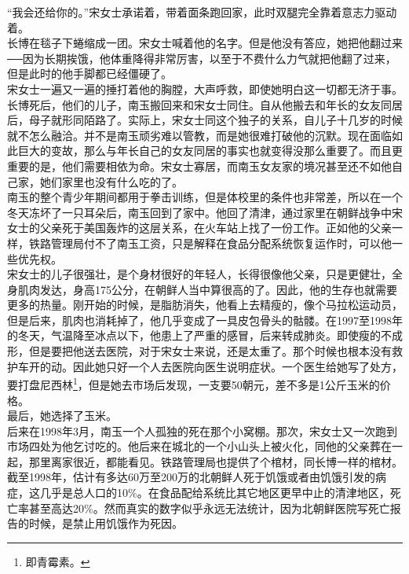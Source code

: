 “我会还给你的。”宋女士承诺着，带着面条跑回家，此时双腿完全靠着意志力驱动着。\\

长博在毯子下蜷缩成一团。宋女士喊着他的名字。但是他没有答应，她把他翻过来──因为长期挨饿，他体重降得非常厉害，以至于不费什么力气就把他翻了过来，但是此时的他手脚都已经僵硬了。\\

宋女士一遍又一遍的捶打着他的胸膛，大声呼救，即使她明白这一切都无济于事。\\

长博死后，他们的儿子，南玉搬回来和宋女士同住。自从他搬去和年长的女友同居后，母子就形同陌路了。实际上，宋女士同这个独子的关系，自儿子十几岁的时候就不怎么融洽。并不是南玉顽劣难以管教，而是她很难打破他的沉默。现在面临如此巨大的变故，那么与年长自己的女友同居的事实也就变得没那么重要了。而且更重要的是，他们需要相依为命。宋女士寡居，而南玉女友家的境况甚至还不如他自己家，她们家里也没有什么吃的了。\\

南玉的整个青少年期间都用于拳击训练，但是体校里的条件也非常差，所以在一个冬天冻坏了一只耳朵后，南玉回到了家中。他回了清津，通过家里在朝鲜战争中宋女士的父亲死于美国轰炸的这层关系，在火车站上找了一份工作。正如他的父亲一样，铁路管理局付不了南玉工资，只是解释在食品分配系统恢复运作时，可以他一些优先权。\\

宋女士的儿子很强壮，是个身材很好的年轻人，长得很像他父亲，只是更健壮，全身肌肉发达，身高175公分，在朝鲜人当中算很高的了。因此，他的生存也就需要更多的热量。刚开始的时候，是脂肪消失，他看上去精瘦的，像个马拉松运动员，但是后来，肌肉也消耗掉了，他几乎变成了一具皮包骨头的骷髅。在1997至1998年的冬天，气温降至冰点以下，他患上了严重的感冒，后来转成肺炎。即使瘦的不成形，但是要把他送去医院，对于宋女士来说，还是太重了。那个时候也根本没有救护车开的动。因此她只好一个人去医院向医生说明症状。一个医生给她写了处方，要打盘尼西林\footnote{即青霉素。}，但是她去市场后发现，一支要50朝元，差不多是1公斤玉米的价格。\\

最后，她选择了玉米。\\

后来在1998年3月，南玉一个人孤独的死在那个小窝棚。那次，宋女士又一次跑到市场四处为他乞讨吃的。他后来在城北的一个小山头上被火化，同他的父亲葬在一起，那里离家很近，都能看见。铁路管理局也提供了个棺材，同长博一样的棺材。\\

截至1998年，估计有多达60万至200万的北朝鲜人死于饥饿或者由饥饿引发的病症，这几乎是总人口的10\%。在食品配给系统比其它地区更早中止的清津地区，死亡率甚至高达20\%。然而真实的数字似乎永远无法统计，因为北朝鲜医院写死亡报告的时候，是禁止用饥饿作为死因。\\

